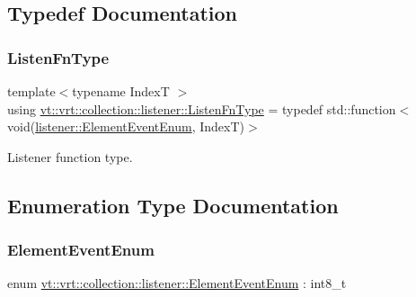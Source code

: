 \subsection{Typedef Documentation}
\mbox{\label{namespacevt_1_1vrt_1_1collection_1_1listener_a62d04c44a3c187eae66bdba2090b4505}} 
\subsubsection{\texorpdfstring{Listen\+Fn\+Type}{ListenFnType}}
{\footnotesize\ttfamily template$<$typename IndexT $>$ \\
using \hyperlink{namespacevt_1_1vrt_1_1collection_1_1listener_a62d04c44a3c187eae66bdba2090b4505}{vt\+::vrt\+::collection\+::listener\+::\+Listen\+Fn\+Type} = typedef std\+::function$<$void(\hyperlink{namespacevt_1_1vrt_1_1collection_1_1listener_a96ace4b58b3d91759e7abda5cc33b012}{listener\+::\+Element\+Event\+Enum}, IndexT)$>$}



Listener function type. 



\subsection{Enumeration Type Documentation}
\mbox{\label{namespacevt_1_1vrt_1_1collection_1_1listener_a96ace4b58b3d91759e7abda5cc33b012}} 
\subsubsection{\texorpdfstring{Element\+Event\+Enum}{ElementEventEnum}}
{\footnotesize\ttfamily enum \hyperlink{namespacevt_1_1vrt_1_1collection_1_1listener_a96ace4b58b3d91759e7abda5cc33b012}{vt\+::vrt\+::collection\+::listener\+::\+Element\+Event\+Enum} \+: int8\+\_\+t\hspace{0.3cm}{\ttfamily [strong]}}



